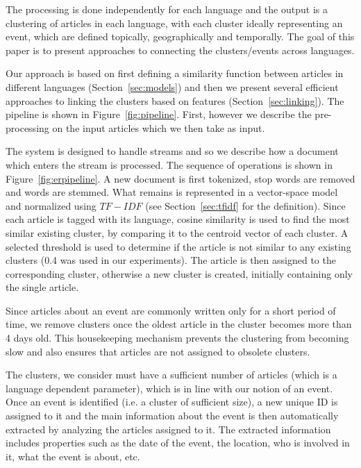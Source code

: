 \documentclass[twoside,11pt]{article}
\begin{document}
The processing is done independently for each language and the output is a clustering of articles in each language, with each cluster ideally representing an event, which are defined  topically, geographically and temporally. The goal of this paper is to present approaches to connecting the clusters/events across languages.

Our approach is based on first defining a similarity function between articles in different languages (Section~\ref{sec:models}) and then we present several efficient approaches to linking the clusters based on features (Section~\ref{sec:linking}). The pipeline is shown in Figure~\ref{fig:pipeline}. First, however we describe the pre-processing on the input articles which we then take as input.


The system is designed to handle streams and so we describe how a document which enters the stream is processed. The sequence of operations is shown in  Figure~\ref{fig:erpipeline}.  A new document is first tokenized, stop words are removed and words are stemmed.
 What remains is represented in a vector-space model and normalized using $TF-IDF$ (see Section~\ref{sec:tfidf} for the definition). Since each article is tagged with its language, cosine similarity  is used to find the most similar existing cluster, by comparing it to the centroid vector of each cluster. A selected threshold is used to determine if the article is not similar to any existing clusters (0.4 was used in our experiments).  The article is then assigned to the corresponding cluster, otherwise a new cluster is created, initially containing only the single article.


Since articles about an event are commonly written only for a short period of time, we remove clusters once the oldest article in the cluster becomes more than 4 days old. This housekeeping mechanism prevents the clustering from becoming slow and also ensures that articles are not assigned to obsolete clusters.

The clusters, we consider must have a sufficient number of articles (which is a language dependent parameter), which is in line with our notion of an event. Once an event is identified (i.e. a cluster of sufficient size), a new unique ID is assigned to it and the main information about the event is then automatically extracted by analyzing the articles assigned to it. The extracted information includes properties such as the date of the event, the location, who is involved in it, what the event is about, etc.
\end{document}
